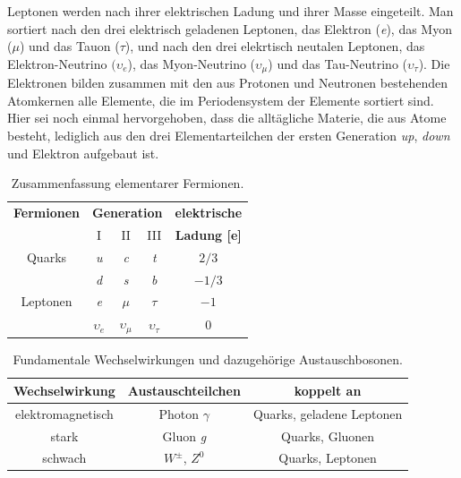 \documentclass[12pt,a4paper]{report}
\begin{document}
Leptonen werden nach ihrer elektrischen Ladung und ihrer Masse eingeteilt. Man sortiert nach den drei elektrisch geladenen Leptonen, das Elektron (\textit{e}), das Myon ($\mu$) und das Tauon ($\tau$), und nach den drei elekrtisch neutalen Leptonen, das Elektron-Neutrino $(\upsilon_{e}$), das Myon-Neutrino ($\upsilon_{\mu}$) und das Tau-Neutrino ($\upsilon_{\tau}$). Die Elektronen bilden zusammen mit den aus Protonen und Neutronen bestehenden Atomkernen alle Elemente, die im Periodensystem der Elemente sortiert sind. Hier sei noch einmal hervorgehoben, dass die alltägliche Materie, die aus Atome besteht, lediglich aus den drei Elementarteilchen der ersten Generation \textit{up}, \textit{down} und Elektron aufgebaut ist. \\
\begin{table}
\centering
\begin{tabular}{|c|c|c|c|c|}
\hline
\multicolumn{1}{|c|}{\textbf{Fermionen}} & \multicolumn{3}{|c|}{\textbf{Generation}} & \multicolumn{1}{|c|}{\textbf{elektrische}} \\
\cline{2-4}
& I & II & III & \textbf{Ladung [e]} \\
\hline
\hline
Quarks & \textit{u} & \textit{c} & \textit{t} & $2/3$\\ 
\cline{2-5}
& \textit{d} & \textit{s} & \textit{b} & $-1/3$\\ 
\hline
\hline
Leptonen & \textit{e} & $\mu$ & $\tau$ & $-1$\\ 
\cline{2-5}
& $\upsilon_{e}$ & $\upsilon_{\mu}$ & $\upsilon_{\tau}$ & $0$\\ 
\hline
\end{tabular}
\caption{Zusammenfassung elementarer Fermionen.}
\label{tab:elementareFermionen}
\end{table} 
\begin{table}
\centering
\begin{tabular}{|c|c|c|}
\hline
\textbf{Wechselwirkung} & \textbf{Austauschteilchen} & \textbf{koppelt an}\\
\hline
\hline
elektromagnetisch & Photon $\gamma$ & Quarks, geladene Leptonen\\
\hline
stark & Gluon \textit{g} & Quarks, Gluonen\\
\hline
schwach & $W^{\pm}$, $Z^{0}$ & Quarks, Leptonen\\
\hline
\end{tabular}
\caption{Fundamentale Wechselwirkungen und dazugehörige Austauschbosonen.}
\label{tab:Wechselwirkungen}
\end{table}
\end{document}
